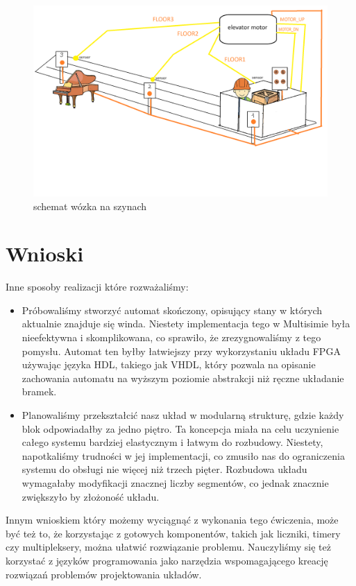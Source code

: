 \documentclass[a4paper]{article}
\begin{document}
\begin{figure}[H]
    \centering
    \includegraphics[width=\textwidth]{nieelevator.png}
    \caption{schemat wózka na szynach}
\end{figure}


\section{Wnioski}
Inne sposoby realizacji które rozważaliśmy:

\begin{itemize} 
\item Próbowaliśmy stworzyć automat skończony, opisujący stany w których aktualnie znajduje się winda. 
Niestety implementacja tego w Multisimie była nieefektywna i 
skomplikowana, co sprawiło, że zrezygnowaliśmy z tego pomysłu.
Automat ten byłby łatwiejszy przy wykorzystaniu układu FPGA używając języka HDL,
takiego jak VHDL, który pozwala na opisanie zachowania automatu na wyższym poziomie abstrakcji 
niż ręczne układanie bramek. 


\item Planowaliśmy przekształcić nasz układ w modularną strukturę, 
gdzie każdy blok odpowiadałby za jedno piętro. 
Ta koncepcja miała na celu uczynienie całego systemu bardziej elastycznym i 
łatwym do rozbudowy. Niestety, napotkaliśmy trudności w jej implementacji, 
co zmusiło nas do ograniczenia systemu do obsługi nie więcej niż trzech pięter. 
Rozbudowa układu wymagałaby modyfikacji znacznej liczby segmentów, co jednak znacznie zwiększyło by 
złożoność układu.
\end{itemize}

Innym wnioskiem który możemy wyciągnąć z wykonania tego ćwiczenia, może być też to, że korzystając 
z gotowych komponentów, takich jak liczniki, timery czy multipleksery, można ułatwić rozwiązanie problemu.
Nauczyliśmy się też korzystać z języków programowania jako narzędzia wspomagającego kreację rozwiązań problemów
projektowania układów.
\end{document}
